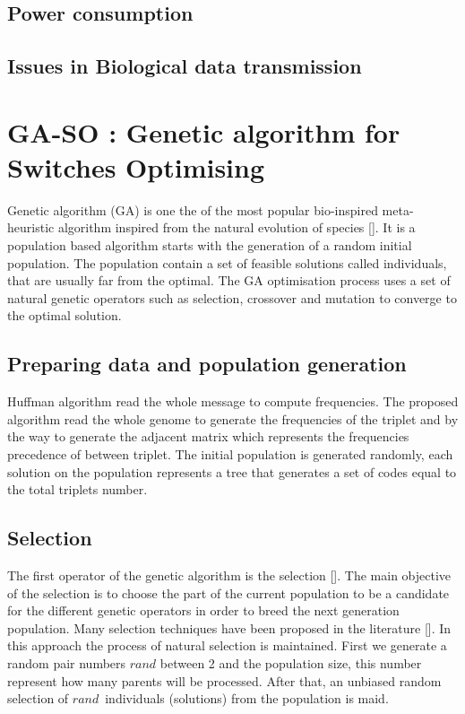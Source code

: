 \documentclass[preprint,12pt]{elsarticle}
\begin{document}
\subsection{Power consumption}
\subsection{Issues in Biological data transmission}
\section{GA-SO : Genetic algorithm for Switches Optimising}
Genetic algorithm (GA) is one the of the most popular bio-inspired meta-heuristic algorithm inspired from the natural evolution of species []. It is a  population based algorithm starts with the generation of a random initial population. The population contain a set of feasible solutions called individuals, that are usually far from the optimal. The GA optimisation process uses a set of natural genetic operators such as selection, crossover and mutation to converge to the optimal solution.
\subsection{Preparing data and population generation}
Huffman algorithm read the whole message to compute frequencies. The proposed algorithm read the whole genome to generate the frequencies of the triplet and by the way to generate the adjacent matrix which represents the frequencies precedence of between triplet. The initial population is generated randomly, each solution on the population represents a tree that generates a set of codes equal to the total triplets number.
\subsection{Selection}
The first operator of the genetic algorithm is the selection []. The main objective of the selection is to choose the part of the current  population to be a candidate for the different genetic operators in order to breed the next generation population. Many selection techniques have been proposed in the literature []. In this approach the  process of natural selection is maintained. First we generate a random pair numbers \textit{$rand$} between 2 and the population size, this number represent how many parents will be processed. After that, an unbiased random selection of \textit{$rand$}~individuals (solutions) from the population is maid. 
\end{document}
